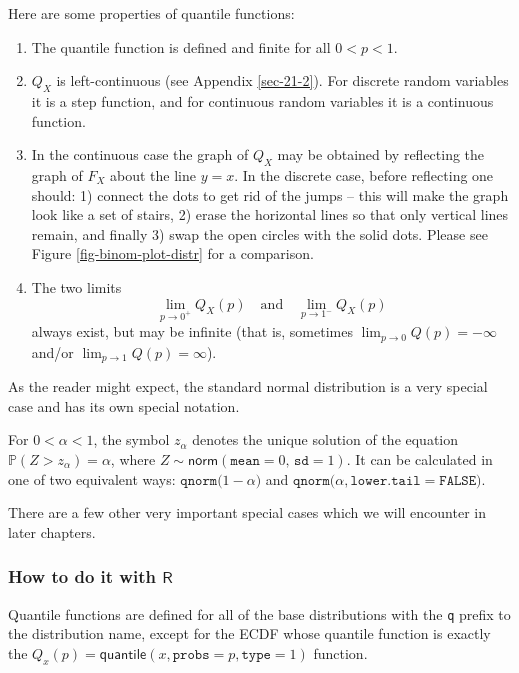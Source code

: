 \documentclass[captions=tableheading]{scrbook}
\begin{document}
\begin{rem}
Here are some properties of quantile functions:
\begin{enumerate}
\item The quantile function is defined and finite for all \(0<p<1\).
\item \(Q_{X}\) is left-continuous (see Appendix \ref{sec-21-2}). For discrete random variables it is a step function, and for continuous random variables it is a continuous function.
\item In the continuous case the graph of \(Q_{X}\) may be obtained by reflecting the graph of \(F_{X}\) about the line \(y=x\). In the discrete case, before reflecting one should: 1) connect the dots to get rid of the jumps -- this will make the graph look like a set of stairs, 2) erase the horizontal lines so that only vertical lines remain, and finally 3) swap the open circles with the solid dots. Please see Figure \ref{fig-binom-plot-distr} for a comparison.
\item The two limits
   \[
   \lim_{p\to0^{+}}Q_{X}(p)\quad \mbox{and}\quad \lim_{p\to1^{-}}Q_{X}(p)
   \]
   always exist, but may be infinite (that is, sometimes \(\lim_{p\to0}Q(p)=-\infty\) and/or \(\lim_{p\to1}Q(p)=\infty\)).
\end{enumerate}

\end{rem}

As the reader might expect, the standard normal distribution is a very special case and has its own special notation.

\begin{defn}
For \(0<\alpha<1\), the symbol \(z_{\alpha}\) denotes the unique solution of the equation \( \mathbb{P} ( Z > z_{\alpha}) = \alpha\), where \(Z \sim \mathsf{norm}(\mathtt{mean} = 0,\,\mathtt{sd} = 1)\). It can be calculated in one of two equivalent ways: \(\mathtt{qnorm(} 1 - \alpha \mathtt{)} \) and \(\mathtt{qnorm(} \alpha \mathtt{, lower.tail = FALSE)} \). 
\end{defn}

There are a few other very important special cases which we will encounter in later chapters. 
\subsubsection{How to do it with \(\mathsf{R}\)}
\label{sec-6-3-1-1}


Quantile functions are defined for all of the base distributions with the \texttt{q} prefix to the distribution name, except for the ECDF whose quantile function is exactly the \( Q_{x}(p) = \mathsf{quantile}(x, \mathtt{probs} = p, \mathtt{type} = 1) \) function. 
\end{document}
